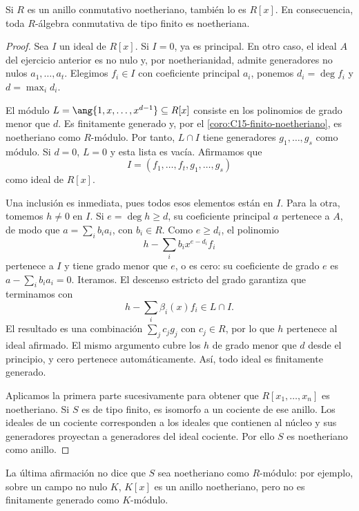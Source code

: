 \begin{teo}\label{teo:C15-Hilbert}
Si $R$ es un anillo conmutativo noetheriano, también lo es $R[x]$. En consecuencia, toda $R$-álgebra conmutativa de tipo finito es noetheriana.
\end{teo}
\begin{proof}
Sea $I$ un ideal de $R[x]$. Si $I=0$, ya es principal. En otro caso, el ideal $A$ del ejercicio anterior es no nulo y, por noetherianidad, admite generadores no nulos $a_1,\ldots,a_t$. Elegimos $f_i\in I$ con coeficiente principal $a_i$, ponemos $d_i=\deg f_i$ y $d=\max_i d_i$.

El módulo $L=\ang{1,x,\ldots,x^{d-1}}\subseteq R[x]$ consiste en los polinomios de grado menor que $d$. Es finitamente generado y, por el \cref{coro:C15-finito-noetheriano}, es noetheriano como $R$-módulo. Por tanto, $L\cap I$ tiene generadores $g_1,\ldots,g_s$ como módulo. Si $d=0$, $L=0$ y esta lista es vacía. Afirmamos que
\[
I=(f_1,\ldots,f_t,g_1,\ldots,g_s)
\]
como ideal de $R[x]$.

Una inclusión es inmediata, pues todos esos elementos están en $I$. Para la otra, tomemos $h\ne0$ en $I$. Si $e=\deg h\geq d$, su coeficiente principal $a$ pertenece a $A$, de modo que $a=\sum_i b_ia_i$, con $b_i\in R$. Como $e\geq d_i$, el polinomio
\[
h-\sum_i b_ix^{e-d_i}f_i
\]
pertenece a $I$ y tiene grado menor que $e$, o es cero: su coeficiente de grado $e$ es $a-\sum_i b_ia_i=0$. Iteramos. El descenso estricto del grado garantiza que terminamos con
\[
h-\sum_i\beta_i(x)f_i\in L\cap I.
\]
El resultado es una combinación $\sum_j c_jg_j$ con $c_j\in R$, por lo que $h$ pertenece al ideal afirmado. El mismo argumento cubre los $h$ de grado menor que $d$ desde el principio, y cero pertenece automáticamente. Así, todo ideal es finitamente generado.

Aplicamos la primera parte sucesivamente para obtener que $R[x_1,\ldots,x_n]$ es noetheriano. Si $S$ es de tipo finito, es isomorfo a un cociente de ese anillo. Los ideales de un cociente corresponden a los ideales que contienen al núcleo y sus generadores proyectan a generadores del ideal cociente. Por ello $S$ es noetheriano como anillo.
\end{proof}
La última afirmación no dice que $S$ sea noetheriano como $R$-módulo: por ejemplo, sobre un campo no nulo $K$, $K[x]$ es un anillo noetheriano, pero no es finitamente generado como $K$-módulo.

